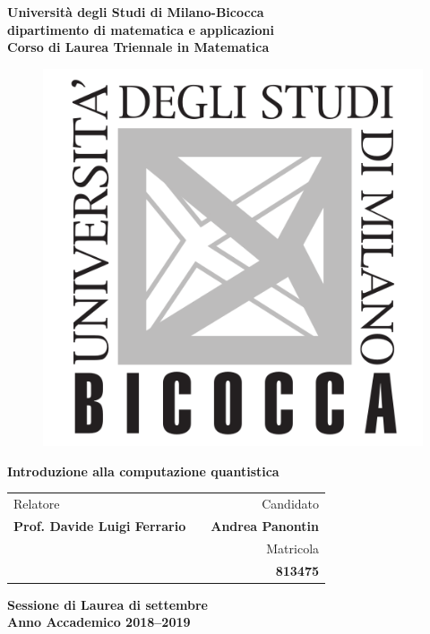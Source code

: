 \linespread{1,5} 
\noindent
\begin{titlepage} 
\begin{center}

\bf\LARGE{Università degli Studi di Milano-Bicocca} \\ 
\vspace{-4mm}
{\Large\sc dipartimento di matematica e applicazioni} \\
\bf\large{Corso di Laurea Triennale in Matematica}
\end{center}
\vspace{22mm} 
\begin{figure}[htp]
\begin{center}
 \includegraphics[scale=0.24]{Images/Logo_Bicocca}
\end{center}
\end{figure}
\vspace{30mm}
\begin{center}

{\fontsize{21pt}{1pt}\selectfont\bfseries {Introduzione alla computazione quantistica}}

\vspace{64mm}
\setlength{\tabcolsep}{0pt}
\begin{tabularx}{0.90\textwidth}{l X r}
\large
  Relatore & \hfill & Candidato\\
[-0.1em]
  {\bfseries Prof. Davide Luigi Ferrario} & \hfill & {\bfseries Andrea Panontin} \\
[0.2em]
    & \hfill & Matricola \\
[-0.1em]
    & \hfill & {\bfseries 813475} \\
\end{tabularx}

\vspace{23mm}
{\large{\bf Sessione di Laurea di settembre\\
Anno Accademico 2018--2019}}
\end{center}
\end{titlepage}
\restoregeometry
\singlespacing

